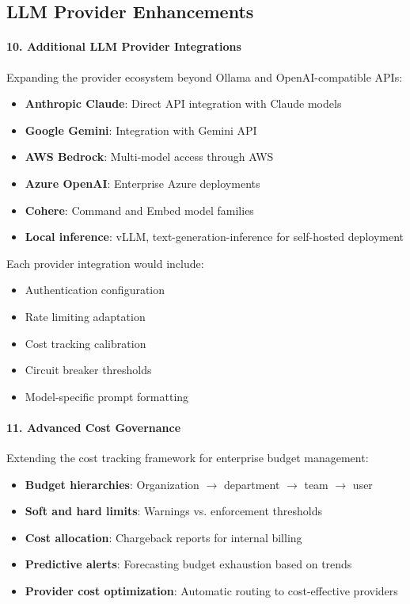 \subsection{LLM Provider Enhancements}

\paragraph{10. Additional LLM Provider Integrations}

Expanding the provider ecosystem beyond Ollama and OpenAI-compatible APIs:

\begin{itemize}
    \item \textbf{Anthropic Claude}: Direct API integration with Claude models
    \item \textbf{Google Gemini}: Integration with Gemini API
    \item \textbf{AWS Bedrock}: Multi-model access through AWS
    \item \textbf{Azure OpenAI}: Enterprise Azure deployments
    \item \textbf{Cohere}: Command and Embed model families
    \item \textbf{Local inference}: vLLM, text-generation-inference for self-hosted deployment
\end{itemize}

Each provider integration would include:
\begin{itemize}
    \item Authentication configuration
    \item Rate limiting adaptation
    \item Cost tracking calibration
    \item Circuit breaker thresholds
    \item Model-specific prompt formatting
\end{itemize}

\paragraph{11. Advanced Cost Governance}

Extending the cost tracking framework for enterprise budget management:

\begin{itemize}
    \item \textbf{Budget hierarchies}: Organization $\rightarrow$ department $\rightarrow$ team $\rightarrow$ user
    \item \textbf{Soft and hard limits}: Warnings vs. enforcement thresholds
    \item \textbf{Cost allocation}: Chargeback reports for internal billing
    \item \textbf{Predictive alerts}: Forecasting budget exhaustion based on trends
    \item \textbf{Provider cost optimization}: Automatic routing to cost-effective providers
\end{itemize}

